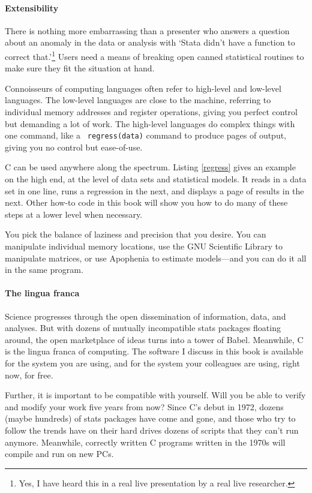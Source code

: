 \paragraph{Extensibility}
There is nothing more embarrassing than a presenter who answers a question
about an anomaly in the data or analysis with `Stata didn't have a function to
correct that.'\footnote{Yes, I have heard this in a real live presentation
by a real live researcher.} Users need a means of breaking open canned
statistical routines to make sure they fit the situation at hand.

Connoisseurs of computing languages often refer to high-level and
low-level languages. The low-level languages are close to the machine,
referring to individual memory addresses and register operations,
giving you perfect control but demanding a lot of work. The high-level
languages do complex things with one command, like a {\tt
regress(data)} command to produce pages of output, giving you no control
but ease-of-use.

C can be used anywhere along the spectrum. Listing \ref{regress} gives
an example on the high end, at the level of data sets and statistical
models. It reads in a data set in one line, runs a regression in the
next, and displays a page of results in the next. Other how-to code in
this book will show you how to do many of these steps at a lower level
when necessary.

You pick the balance of laziness and precision that you desire. You
can manipulate individual memory locations, use the GNU Scientific
Library to manipulate matrices, or use Apophenia to estimate models---and
you can do it all in the same program.

\paragraph{The lingua franca}
Science progresses through the open dissemination of information, data,
and analyses. But with dozens of mutually incompatible stats packages
floating around, the open marketplace of ideas turns into a tower of Babel.
Meanwhile, C is the lingua franca of computing. The software I discuss
in this book is available for the system you are using, and for the
system your colleagues are using, right now, for free.

Further, it is important to be compatible with yourself. Will you be able
to verify and modify your work five years from now? Since C's debut
in 1972, dozens (maybe hundreds) of stats packages have come and gone,
and those who try to follow the trends have on their hard drives dozens
of scripts that they can't run anymore.  Meanwhile, correctly written
C programs written in the 1970s will compile and run on new PCs.


